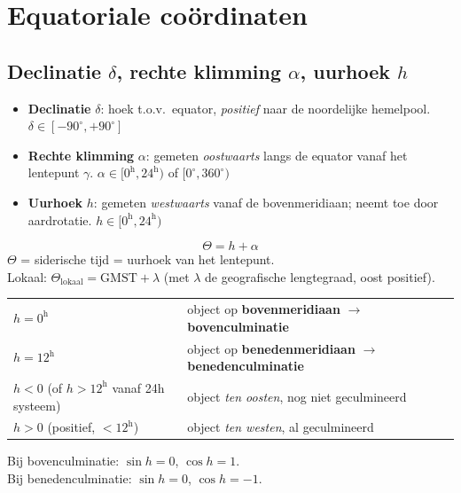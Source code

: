 \documentclass[11pt, a4paper]{article}
\newcommand{\graden}{^{\circ}}
\begin{document}
\section{Equatoriale coördinaten}

\subsection{Declinatie $\delta$, rechte klimming $\alpha$, uurhoek $h$}

\begin{formule}[Definities]
\begin{itemize}[leftmargin=1.5em]
  \item \textbf{Declinatie} $\delta$: hoek t.o.v.\ equator, \emph{positief} naar de noordelijke hemelpool.
    \quad $\delta \in [-90\graden, +90\graden]$
  \item \textbf{Rechte klimming} $\alpha$: gemeten \emph{oostwaarts} langs de equator vanaf het lentepunt $\gamma$.
    \quad $\alpha \in [0^\mathrm{h}, 24^\mathrm{h})$ of $[0\graden, 360\graden)$
  \item \textbf{Uurhoek} $h$: gemeten \emph{westwaarts} vanaf de bovenmeridiaan; neemt toe door aardrotatie.
    \quad $h \in [0^\mathrm{h}, 24^\mathrm{h})$
\end{itemize}
\end{formule}

\begin{formule}
\[
  \boxed{\Theta = h + \alpha}
\]
$\Theta$ = siderische tijd = uurhoek van het lentepunt. \\
Lokaal: $\Theta_\mathrm{lokaal} = \mathrm{GMST} + \lambda$ \quad (met $\lambda$ de geografische lengtegraad, oost positief).
\end{formule}

\begin{weetje}
\renewcommand{\arraystretch}{1.3}
\begin{tabular}{ll}
  $h = 0^\mathrm{h}$ & object op \textbf{bovenmeridiaan} $\to$ \textbf{bovenculminatie} \\
  $h = 12^\mathrm{h}$ & object op \textbf{benedenmeridiaan} $\to$ \textbf{benedenculminatie} \\
  $h < 0$ (of $h > 12^\mathrm{h}$ vanaf 24h systeem) & object \emph{ten oosten}, nog niet geculmineerd \\
  $h > 0$ (positief, $< 12^\mathrm{h}$) & object \emph{ten westen}, al geculmineerd \\
\end{tabular}

Bij bovenculminatie: $\sin h = 0$, $\cos h = 1$.\\
Bij benedenculminatie: $\sin h = 0$, $\cos h = -1$.
\end{weetje}
\end{document}
